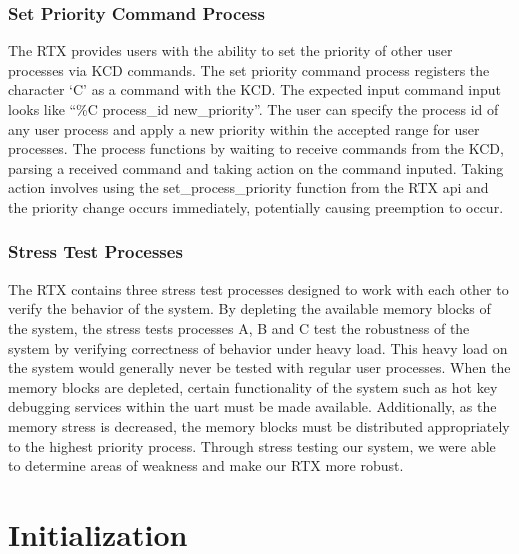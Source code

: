 \documentclass[12pt]{report}
\begin{document}
\subsection{Set Priority Command Process}
  The RTX provides users with the ability to set the priority of other user processes via KCD commands. The set priority command process registers the character ‘C’ as a command with the KCD. The expected input command input looks like “\%C process\_id new\_priority”. The user can specify the process id of any user process and apply a new priority within the accepted range for user processes. The process functions by waiting to receive commands from the KCD, parsing a received command and taking action on the command inputed. Taking action involves using the set\_process\_priority function from the RTX api and the priority change occurs immediately, potentially causing preemption to occur.

\subsection{Stress Test Processes}
The RTX contains three stress test processes designed to work with each other to verify the behavior of the system. By depleting the available memory blocks of the system, the stress tests processes A, B and C test the robustness of the system by verifying correctness of behavior under heavy load. This heavy load on the system would generally never be tested with regular user processes. When the memory blocks are depleted, certain functionality of the system such as hot key debugging services within the uart must be made available. Additionally, as the memory stress is decreased, the memory blocks must be distributed appropriately to the highest priority process. Through stress testing our system, we were able to determine areas of weakness and make our RTX more robust.

\chapter{Initialization}
\end{document}

